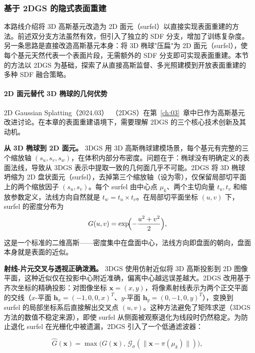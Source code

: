 \subsubsection{基于 2DGS 的隐式表面重建}
\label{subsec:04_2_3}

本路线介绍将 3D 高斯基元改造为 2D 面元（surfel）以直接实现表面重建的方法。前述双分支方法虽然有效，但引入了独立的 SDF 分支，增加了训练复杂度。另一条思路是直接改造高斯基元本身：将 3D 椭球"压扁"为 2D 面元（surfel），使每个基元天然代表一个表面片段，无需额外的 SDF 分支即可实现表面重建。本节的方法以 2DGS 为基础，探索了从直接高斯监督、多光照建模到开放表面重建的多种 SDF 融合策略。

\paragraph{2D 面元替代 3D 椭球的几何优势}

2D Gaussian Splatting（2024.03）~\cite{2403_17888}（2DGS）在第~\ref{ch:03}~章中已作为高斯基元改进讨论。在本章的表面重建语境下，需要理解 2DGS 的三个核心技术创新及其动机。

\textbf{从 3D 椭球到 2D 面元。} 3DGS 用 3D 高斯椭球建模场景，每个基元有完整的三个缩放轴 $(s_u, s_v, s_w)$，在体积内部分布密度。问题在于：椭球没有明确定义的表面法线，导致从 3DGS 表示中提取一致的几何面几乎不可能。2DGS 将 3D 椭球坍缩为 2D 盘状面元（surfel），去掉第三个缩放轴（设为零），仅保留局部切平面上的两个缩放因子 $(s_u, s_v)$。每个 surfel 由中心点 $\mu_k$、两个主切向量 $t_u, t_v$ 和缩放参数定义，法线方向自然就是 $t_w=t_u \times t_v$。在局部切平面坐标 $(u,v)$ 下，surfel 的密度分布为
\begin{equation}
  G(u,v) = \exp\!\Bigl(-\frac{u^2+v^2}{2}\Bigr),
\end{equation}

这是一个标准的二维高斯——密度集中在盘面中心，法线方向即盘面的朝向，盘面本身就是表面的近似。

\textbf{射线-片元交叉与透视正确泼溅。} 3DGS 使用仿射近似将 3D 高斯投影到 2D 图像平面，这种近似仅在投影中心附近准确，偏离中心越远误差越大。2DGS 改用基于齐次坐标的精确投影：对图像坐标 $\mathbf{x}=(x,y)$，将像素射线表示为两个正交平面的交线（$x$-平面 $\mathbf{h}_x=(-1,0,0,x)^T$、$y$-平面 $\mathbf{h}_y=(0,-1,0,y)^T$），变换到 surfel 的局部坐标系后直接解出交叉点 $(u,v)$。这种方法避免了矩阵求逆（3DGS 方法的数值不稳定来源），即使 surfel 从侧面被观察退化为线段时仍然稳定。为防止退化 surfel 在光栅化中被遗漏，2DGS 引入了一个低通滤波器：

\begin{equation}
  \hat{G}(\mathbf{x}) = \max\!\bigl(G(\mathbf{x}),\, \mathcal{G}_\sigma(\|\mathbf{x}-\pi(\mu_k)\|)\bigr),
\end{equation}

